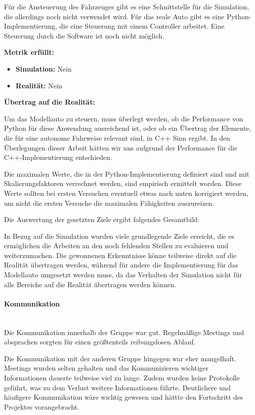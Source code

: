 \begin{enumerate}[leftmargin=*]
    Für die Ansteuerung des Fahrzeuges gibt es eine Schnittstelle für die Simulation, die allerdings noch nicht verwendet wird.
    Für das reale Auto gibt es eine Python-Implementierung, die eine Steuerung mit einem Controller arbeitet. 
    Eine Steuerung durch die Software ist noch nicht möglich.

    \textbf{Metrik erfüllt:}
    \begin{itemize}
        \item \textbf{Simulation:} Nein
        \item \textbf{Realität:} Nein
    \end{itemize}
    
    \textbf{Übertrag auf die Realität:}

    Um das Modellauto zu steuern, muss überlegt werden, ob die Performance von Python für diese Anwendung ausreichend ist, 
    oder ob ein Übertrag der Elemente, die für eine autonome Fahrweise relevant sind, in C++ Sinn ergibt. 
    In den Überlegungen dieser Arbeit hätten wir uns aufgrund der Performance für die C++-Implementierung entschieden.

    Die maximalen Werte, die in der Python-Implementierung definiert sind und mit Skalierungsfaktoren verrechnet werden, 
    sind empirisch ermittelt worden. Diese Werte sollten bei ersten Versuchen eventuell etwas nach unten korrigiert werden,
    um nicht die ersten Versuche die maximalen Fähigkeiten auszureizen.
\end{enumerate}

Die Auswertung der gesetzten Ziele ergibt folgendes Gesamtbild:

In Bezug auf die Simulation wurden viele grundlegende Ziele erreicht, die es ermöglichen die Arbeiten an den noch fehlenden Stellen zu evaluieren 
und weiterzumachen.
Die gewonnenen Erkenntnisse könne teilweise direkt auf die Realität übertragen werden, während für andere die Implementierung für das Modellauto 
umgesetzt werden muss, da das Verhalten der Simulation nicht für alle Bereiche auf die Realität übertragen werden können.

\paragraph{Kommunikation} \mbox{}\\
Die Kommunikation innerhalb der Gruppe war gut.
Regelmäßige Meetings und absprachen sorgten für einen größtenteils reibungslosen Ablauf.

Die Kommunikation mit der anderen Gruppe hingegen war eher mangelhaft.
Meetings wurden selten gehalten und das Kommunizieren wichtiger Informationen dauerte teilweise viel zu lange.
Zudem wurden keine Protokolle geführt, was zu dem Verlust weitere Informationen führte.
Deutlichere und häufigere Kommunikation wäre wichtig gewesen und hättte den Fortschritt des Projektes vorangebracht.

